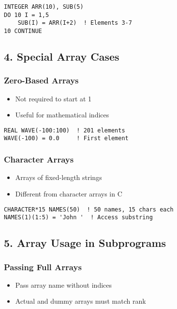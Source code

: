 \documentclass{book}
\begin{document}
\begin{verbatim}
INTEGER ARR(10), SUB(5)
DO 10 I = 1,5
    SUB(I) = ARR(I+2)  ! Elements 3-7
10 CONTINUE
\end{verbatim}

\subsection*{4. Special Array Cases}
\subsubsection*{Zero-Based Arrays}
\begin{itemize}
\item Not required to start at 1
\item Useful for mathematical indices
\end{itemize}

\begin{verbatim}
REAL WAVE(-100:100)  ! 201 elements
WAVE(-100) = 0.0     ! First element
\end{verbatim}

\subsubsection*{Character Arrays}
\begin{itemize}
\item Arrays of fixed-length strings
\item Different from character arrays in C
\end{itemize}

\begin{verbatim}
CHARACTER*15 NAMES(50)  ! 50 names, 15 chars each
NAMES(1)(1:5) = 'John '  ! Access substring
\end{verbatim}

\subsection*{5. Array Usage in Subprograms}
\subsubsection*{Passing Full Arrays}
\begin{itemize}
\item Pass array name without indices
\item Actual and dummy arrays must match rank
\end{itemize}
\end{document}

